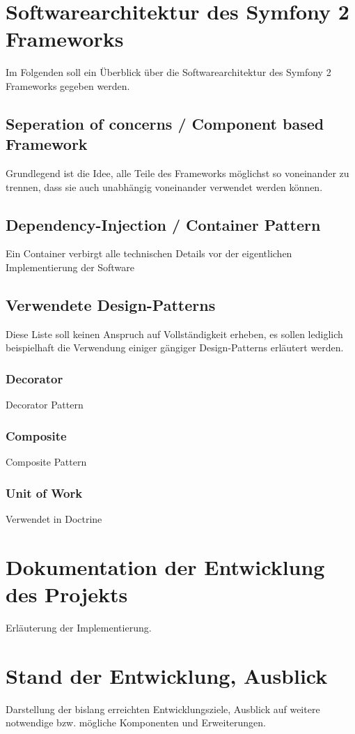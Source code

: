 \documentclass[12pt]{report}
\begin{document}
\chapter{Softwarearchitektur des Symfony 2 Frameworks}
\label{sec:symfony}
Im Folgenden soll ein Überblick über die Softwarearchitektur des Symfony 2 Frameworks gegeben werden.
\section{Seperation of concerns / Component based Framework}
Grundlegend ist die Idee, alle Teile des Frameworks möglichst so voneinander zu trennen, dass sie auch unabhängig voneinander verwendet werden können.
\section{Dependency-Injection / Container Pattern}
Ein Container verbirgt alle technischen Details vor der eigentlichen Implementierung der Software
\section{Verwendete Design-Patterns}
Diese Liste soll keinen Anspruch auf Vollständigkeit erheben, es sollen lediglich beispielhaft die Verwendung einiger gängiger Design-Patterns erläutert werden.
\subsection{Decorator}
Decorator Pattern
\subsection{Composite}
Composite Pattern
\subsection{Unit of Work}
Verwendet in Doctrine \cite{ab94} 


\chapter{Dokumentation der Entwicklung des Projekts}
Erläuterung der Implementierung.


\chapter{Stand der Entwicklung, Ausblick}
Darstellung der bislang erreichten Entwicklungsziele, Ausblick auf weitere notwendige bzw. mögliche Komponenten und Erweiterungen.





\end{document}
